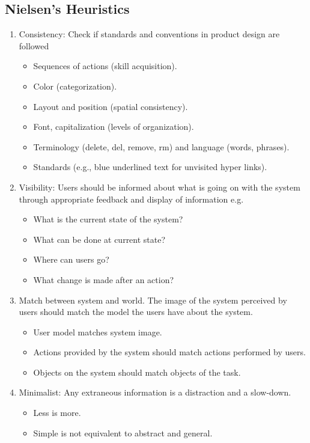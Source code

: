 \documentclass[letterpaper,cleveref]{lipics-v2019}
\theoremstyle{definition}
\begin{document}
\subsection{Nielsen’s Heuristics}
\begin{enumerate}
	\item Consistency: Check if standards and conventions in product design are followed
 \begin{itemize}
 	\item Sequences of actions (skill acquisition).
 	\item Color (categorization).
 	\item Layout and position (spatial consistency).
 	\item Font, capitalization (levels of organization).
 	\item Terminology (delete, del, remove, rm) and language (words, phrases).
 	\item Standards (e.g.,	blue underlined text for unvisited hyper links).
 \end{itemize}
\item Visibility: Users should be informed about what is going on with the system through appropriate feedback and display of information e.g. 
 \begin{itemize}
 \item What is the current state of the system?
 \item What can be done at current state?
 \item Where can users go?
 \item What change is made after an action?
 \end{itemize}
\item Match between system and world. The image of the system perceived by users should match the model the users have about the system. 
\begin {itemize}
\item User model matches system image.
\item Actions provided by the system should match actions performed by users.
\item Objects on the system should match objects of the task.
\end {itemize}
\item Minimalist: Any extraneous information is a distraction and a slow-down. 
\begin{itemize}
\item Less is more.
\item Simple is not equivalent to abstract and general.

\end{itemize}
\end{enumerate}
\end{document}
